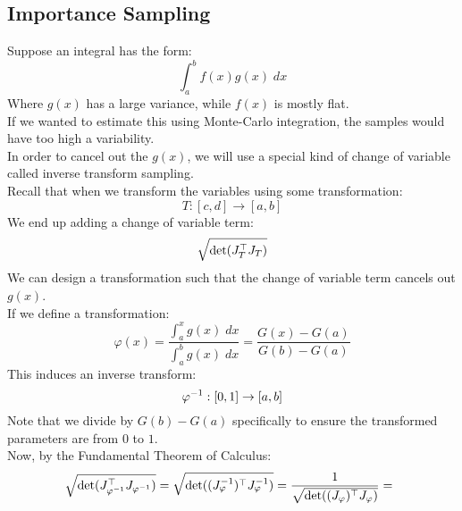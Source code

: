\documentclass[12pt]{article}
\begin{document}
\newpage

\subsection*{Importance Sampling}

Suppose an integral has the form:
\[ \int_a^b f(x)g(x)\;dx \]
Where $g(x)$ has a large variance,
while $f(x)$ is mostly flat. \\

If we wanted to estimate this using
Monte-Carlo integration, the samples would have
too high a variability. \\

In order to cancel out the $g(x)$,
we will use a special kind of change of variable
called inverse transform sampling. \\

Recall that when we transform the variables
using some transformation:
\[ T: [c, d] \to [a, b] \]
We end up adding a change of variable term:
\[ \sqrt{\vs{100}\det(J_T^\top J_T)} \]
We can design a transformation such that the
change of variable term cancels out $g(x)$. \\

If we define a transformation:
\[ \varphi(x) = \dfrac{\int_a^x g(x) \;dx}
{\int_a^b g(x) \;dx}
= \dfrac{G(x) - G(a)}
{G(b) - G(a)} \]
This induces an inverse transform:
\[ \varphi^{-1}: [0, 1] \to [a, b] \]
Note that we divide by $G(b) - G(a)$
specifically to ensure the transformed parameters
are from $0$ to $1$. \\

Now, by the Fundamental Theorem of Calculus:
\[ \sqrt{\det(J_{\varphi^{-1}}^\top J_{\varphi^{-1}})}
= \sqrt{\det((J_{\varphi}^{-1})^\top J_{\varphi}^{-1})}
= \dfrac{1}{\sqrt{\det((J_{\varphi})^\top J_{\varphi})}}
= \dfrac{}{}\]
\end{document}
